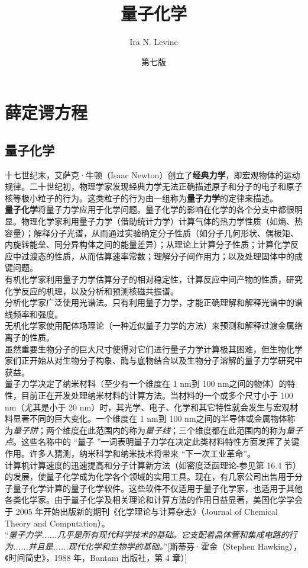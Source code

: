 \documentclass{book}
\title{量子化学}
\author{Ira N. Levine}
\date{第七版}
\begin{document}
	
	\maketitle
	
	\frontmatter
	\tableofcontents
	
	\mainmatter
	
	\chapter{薛定谔方程}
	\section{量子化学}
	十七世纪末，艾萨克·牛顿（Isaac Newton）创立了\textbf{经典力学}，即宏观物体的运动规律。二十世纪初，物理学家发现经典力学无法正确描述原子和分子的电子和原子核等极小粒子的行为。这类粒子的行为由一组称为\textbf{量子力学}的定律来描述。\\
	\indent \textbf{量子化学}将量子力学应用于化学问题。量子化学的影响在化学的各个分支中都很明显。物理化学家利用量子力学（借助统计力学）计算气体的热力学性质（如熵、热容量）；解释分子光谱，从而通过实验确定分子性质（如分子几何形状、偶极矩、内旋转能垒、同分异构体之间的能量差异）；从理论上计算分子性质；计算化学反应中过渡态的性质，从而估算速率常数；理解分子间作用力；以及处理固体中的成键问题。\\
	\indent 有机化学家利用量子力学估算分子的相对稳定性，计算反应中间产物的性质，研究化学反应的机理，以及分析和预测核磁共振谱。\\
	\indent 分析化学家广泛使用光谱法。只有利用量子力学，才能正确理解和解释光谱中的谱线频率和强度。\\
	\indent 无机化学家使用配体场理论（一种近似量子力学的方法）来预测和解释过渡金属络离子的性质。\\
	\indent 虽然重要生物分子的巨大尺寸使得对它们进行量子力学计算极其困难，但生物化学家们正开始从对生物分子构象、酶与底物结合以及生物分子溶解的量子力学研究中获益。\\
	\indent 量子力学决定了纳米材料（至少有一个维度在 1 nm到 100 nm之间的物体）的特性，目前正在开发处理纳米材料的计算方法。当材料的一个或多个尺寸小于 100 nm（尤其是小于 20 nm）时，其光学、电子、化学和其它特性就会发生与宏观材料显著不同的巨大变化。一个维度在 1 nm到 100 nm之间的半导体或金属物体称为\textit{量子阱}；两个维度在此范围内的称为\textit{量子线}；三个维度都在此范围内的称为\textit{量子点}。这些名称中的 “量子 ”一词表明量子力学在决定此类材料特性方面发挥了关键作用。许多人猜测，纳米科学和纳米技术将带来 “下一次工业革命”。\\
	\indent 计算机计算速度的迅速提高和分子计算新方法（如密度泛函理论-参见第 16.4 节）的发展，使量子化学成为化学各个领域的实用工具。现在，有几家公司出售用于分子量子化学计算的量子化学软件。这些软件不仅适用于量子化学家，也适用于其他各类化学家。由于量子化学及相关理论和计算方法的作用日益显著，美国化学学会于 2005 年开始出版新的期刊《化学理论与计算杂志》（Journal of Chemical Theory and Computation）。\\
	\indent “\textit{量子力学......几乎是所有现代科学技术的基础。它支配着晶体管和集成电路的行为......并且是......现代化学和生物学的基础。}”[斯蒂芬·霍金（Stephen Hawking），《时间简史》，1988 年，Bantam 出版社，第 4 章）]
	
\end{document}
